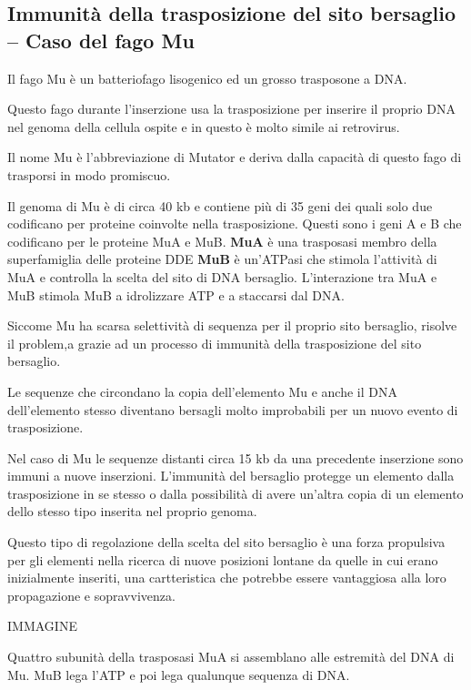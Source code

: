 \documentclass[]{article}
\begin{document}
\subsection{Immunità della trasposizione del sito bersaglio -- Caso del
fago
Mu}\label{immunituxe0-della-trasposizione-del-sito-bersaglio-caso-del-fago-mu}

Il fago Mu è un batteriofago lisogenico ed un grosso trasposone a DNA.

Questo fago durante l'inserzione usa la trasposizione per inserire il
proprio DNA nel genoma della cellula ospite e in questo è molto simile
ai retrovirus.

Il nome Mu è l'abbreviazione di Mutator e deriva dalla capacità di
questo fago di trasporsi in modo promiscuo.

Il genoma di Mu è di circa 40 kb e contiene più di 35 geni dei quali
solo due codificano per proteine coinvolte nella trasposizione. Questi
sono i geni A e B che codificano per le proteine MuA e MuB. \textbf{MuA}
è una trasposasi membro della superfamiglia delle proteine DDE
\textbf{MuB} è un'ATPasi che stimola l'attività di MuA e controlla la
scelta del sito di DNA bersaglio. L'interazione tra MuA e MuB stimola
MuB a idrolizzare ATP e a staccarsi dal DNA.

Siccome Mu ha scarsa selettività di sequenza per il proprio sito
bersaglio, risolve il problem,a grazie ad un processo di immunità della
trasposizione del sito bersaglio.

Le sequenze che circondano la copia dell'elemento Mu e anche il DNA
dell'elemento stesso diventano bersagli molto improbabili per un nuovo
evento di trasposizione.

Nel caso di Mu le sequenze distanti circa 15 kb da una precedente
inserzione sono immuni a nuove inserzioni. L'immunità del bersaglio
protegge un elemento dalla trasposizione in se stesso o dalla
possibilità di avere un'altra copia di un elemento dello stesso tipo
inserita nel proprio genoma.

Questo tipo di regolazione della scelta del sito bersaglio è una forza
propulsiva per gli elementi nella ricerca di nuove posizioni lontane da
quelle in cui erano inizialmente inseriti, una cartteristica che
potrebbe essere vantaggiosa alla loro propagazione e sopravvivenza.

IMMAGINE

Quattro subunità della trasposasi MuA si assemblano alle estremità del
DNA di Mu. MuB lega l'ATP e poi lega qualunque sequenza di DNA.
\end{document}
